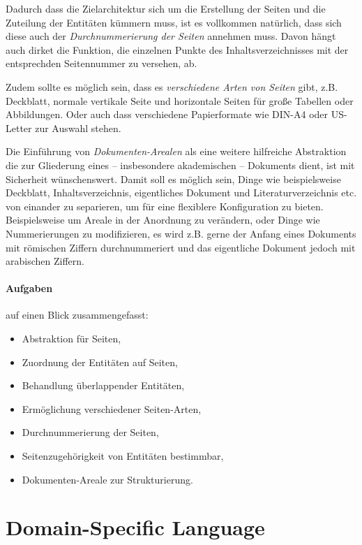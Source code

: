 Dadurch dass die Zielarchitektur sich um die Erstellung der Seiten und
die Zuteilung der Entitäten kümmern muss, ist es vollkommen natürlich,
dass sich diese auch der \emph{Durchnummerierung der Seiten} annehmen muss.
Davon hängt auch dirket die Funktion, die einzelnen Punkte des
Inhaltsverzeichnisses mit der entsprechden Seitennummer zu versehen, ab.

Zudem sollte es möglich sein, dass es \emph{verschiedene Arten von Seiten}
gibt, z.B. Deckblatt, normale vertikale Seite und horizontale Seiten für
große Tabellen oder Abbildungen. Oder auch dass verschiedene Papierformate
wie DIN-A4 oder US-Letter zur Auswahl stehen.

Die Einführung von \emph{Dokumenten-Arealen} als eine weitere hilfreiche
Abstraktion die zur Gliederung eines -- insbesondere
akademischen -- Dokuments dient, ist mit Sicherheit wünschenswert.
Damit soll es möglich sein, Dinge wie beispielsweise
Deckblatt, Inhaltsverzeichnis, eigentliches Dokument
und Literaturverzeichnis etc. von einander zu separieren, um für eine
flexiblere Konfiguration zu bieten. Beispielsweise um Areale in der Anordnung zu
verändern, oder Dinge wie Nummerierungen zu modifizieren, es wird z.B.
gerne der Anfang eines Dokuments mit römischen Ziffern durchnummeriert
und das eigentliche Dokument jedoch mit arabischen Ziffern.


\paragraph{Aufgaben} auf einen Blick zusammengefasst:

\begin{itemize}
  \item Abstraktion für Seiten,
  \item Zuordnung der Entitäten auf Seiten,
  \item Behandlung überlappender Entitäten,
  \item Ermöglichung verschiedener Seiten-Arten,
  \item Durchnummerierung der Seiten,
  \item Seitenzugehörigkeit von Entitäten bestimmbar,
  \item Dokumenten-Areale zur Strukturierung.
\end{itemize}


\section{Domain-Specific Language}\label{sec-dsl}

